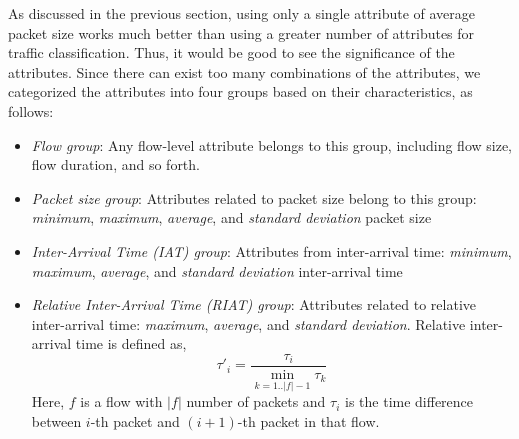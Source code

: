 \documentclass[conference]{IEEEtran}
\begin{document}

As discussed in the previous section, using only a single attribute of average packet size works much better than using a greater number of attributes for traffic classification. 
Thus, it would be good to see the significance of the attributes.
Since there can exist too many combinations of the attributes, we categorized the attributes into four groups based on their characteristics, as follows:

\begin{itemize} \itemsep3pt \parskip3pt 
	\item \emph{Flow group}: Any flow-level attribute belongs to this group, including flow size, flow duration, and so forth.
	\item \emph{Packet size group}: Attributes related to packet size belong to this group: \emph{minimum}, \emph{maximum}, \emph{average}, and \emph{standard deviation} packet size
	\item \emph{Inter-Arrival Time (IAT) group}: Attributes from inter-arrival time: \emph{minimum}, \emph{maximum}, \emph{average}, and \emph{standard deviation} inter-arrival time
\item \emph{Relative Inter-Arrival Time (RIAT) group}: Attributes related to relative inter-arrival time: \emph{maximum}, \emph{average}, and \emph{standard deviation}. Relative inter-arrival time is defined as,
	$$\tau'_i = \frac{\tau_i}{\displaystyle \min_{k=1..|f|-1}{\tau_k}}$$
	Here, $f$ is a flow with $|f|$ number of packets and $\tau_i$ is the time difference between $i$-th packet and $(i+1)$-th packet in that flow.
\end{itemize}
\end{document}
